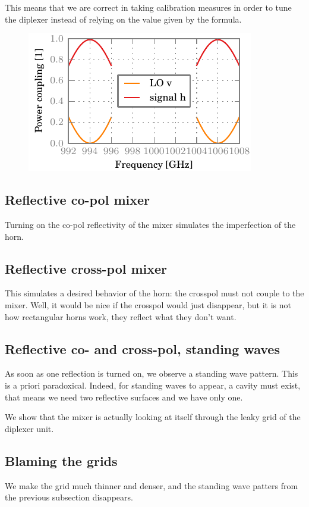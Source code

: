 This means that we are correct in taking calibration measures in order to tune the diplexer instead of relying on the value given by the formula.

\begin{figure}
    \centering
    \includegraphics{chapter_3/0_ideal_h_dsb}
\end{figure}

\subsection{Reflective co-pol mixer}
Turning on the co-pol reflectivity of the mixer simulates the imperfection of the horn.

\subsection{Reflective cross-pol mixer}
This simulates a desired behavior of the horn: the crosspol must not couple to the mixer.
Well, it would be nice if the crosspol would just disappear, but it is not how rectangular horns work, they reflect what they don't want.

\subsection{Reflective co- and cross-pol, standing waves}
As soon as one reflection is turned on, we observe a standing wave pattern.
This is a priori paradoxical.
Indeed, for standing waves to appear, a cavity must exist, that means we need two reflective surfaces and we have only one.

We show that the mixer is actually looking at itself through the leaky grid of the diplexer unit.

\subsection{Blaming the grids}
We make the grid much thinner and denser, and the standing wave patters from the previous subsection disappears.

